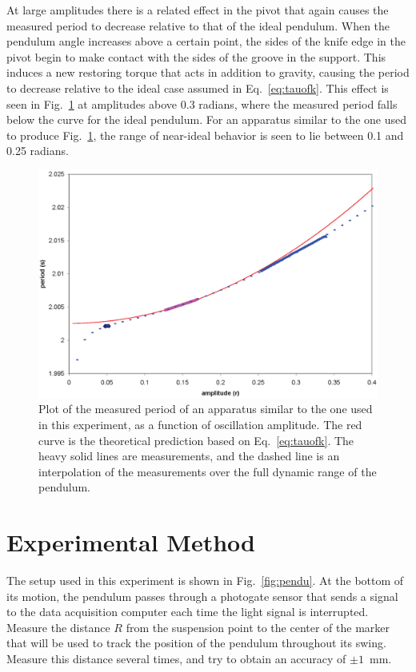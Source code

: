 \documentclass{revtex4}
\begin{document}
At large amplitudes there is a related effect in the pivot that again
causes the measured period to decrease relative to that of the ideal
pendulum.  When the pendulum angle increases above a certain point, the
sides of the knife edge in the pivot begin to make contact with the
sides of the groove in the support.  This induces a new restoring torque
that acts in addition to gravity, causing the period to decrease relative
to the ideal case assumed in Eq.~\ref{eq:tauofk}.  This effect is seen
in Fig.~\ref{fig:penduap} at amplitudes above 0.3 radians, where the
measured period falls below the curve for the ideal pendulum.  For an
apparatus similar to the one used to produce Fig.~\ref{fig:penduap},
the range of near-ideal behavior is seen to lie between 0.1 and 0.25
radians.

\begin{figure}
\includegraphics[width=6in]{penduap.eps}
\caption{\label{fig:penduap}
Plot of the measured period of an apparatus similar to the one used in
this experiment, as a function of oscillation amplitude.  The red curve
is the theoretical prediction based on Eq.~\ref{eq:tauofk}.  The heavy
solid lines are measurements, and the dashed line is an interpolation
of the measurements over the full dynamic range of the pendulum.
}
\end{figure}

\section{Experimental Method}

The setup used in this experiment is shown in Fig.~\ref{fig:pendu}.
At the bottom of its motion, the pendulum passes through a photogate
sensor that sends a signal to the data acquisition computer each time
the light signal is interrupted.  Measure the distance $R$ from the
suspension point to the center of the marker that will be used to
track the position of the pendulum throughout its swing.  Measure this
distance several times, and try to obtain an accuracy of $\pm 1$~mm.
\end{document}
